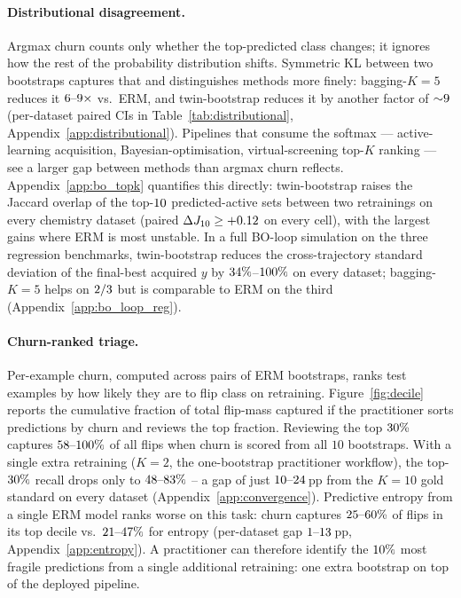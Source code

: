 
\paragraph{Distributional disagreement.}
Argmax churn counts only whether the top-predicted class changes; it
ignores how the rest of the probability distribution shifts.  Symmetric
KL between two bootstraps captures that and distinguishes methods more
finely: bagging-$K{=}5$ reduces it
$6\text{--}9\times$ vs.\ ERM, and
twin-bootstrap reduces it by another factor of
${\sim}9$ (per-dataset paired CIs in
Table~\ref{tab:distributional}, Appendix~\ref{app:distributional}).
Pipelines that consume the softmax --- active-learning acquisition,
Bayesian-optimisation, virtual-screening top-$K$ ranking --- see a
larger gap between methods than argmax churn reflects.
Appendix~\ref{app:bo_topk} quantifies this directly: twin-bootstrap
raises the Jaccard overlap of the top-$10$ predicted-active
sets between two retrainings on every chemistry dataset (paired
$\Delta J_{10} \geq +0.12$ on every cell), with
the largest gains where ERM is most unstable.  In a full BO-loop
simulation on the three regression benchmarks, twin-bootstrap
reduces the cross-trajectory standard deviation of the final-best
acquired $y$ by
$34\%$--$100\%$ on every
dataset; bagging-$K{=}5$ helps on
$2/3$ but is comparable
to ERM on the third (Appendix~\ref{app:bo_loop_reg}).

\paragraph{Churn-ranked triage.}
\label{sec:churn-decile}
Per-example churn, computed across pairs of ERM bootstraps, ranks
test examples by how likely they are to flip class on retraining.
Figure~\ref{fig:decile} reports the cumulative fraction of total
flip-mass captured if the practitioner sorts predictions by
churn and reviews the top fraction.  Reviewing the top $30\%$ captures
$58\text{--}100\%$ of all flips when churn
is scored from all $10$ bootstraps.  With a single extra retraining
($K{=}2$, the one-bootstrap practitioner workflow), the
top-$30\%$ recall drops only to
$48\text{--}83\%$ -- a gap of just
$10\text{--}24$\,pp
from the $K{=}10$ gold standard on every dataset
(Appendix~\ref{app:convergence}).  Predictive entropy from a single
ERM model ranks worse on this task: churn captures
$25\text{--}60\%$ of flips in its top decile vs.\
$21\text{--}47\%$ for entropy (per-dataset
gap $1\text{--}13$\,pp,
Appendix~\ref{app:entropy}).
A practitioner can therefore identify the $10\%$ most
fragile predictions from a single additional retraining: one extra
bootstrap on top of the deployed pipeline.

